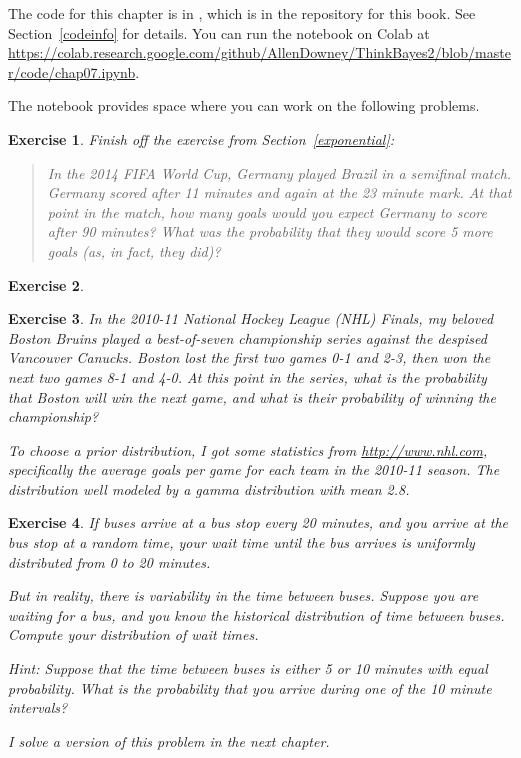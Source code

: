 \documentclass[12pt]{book}
\theoremstyle{exercise}
\newtheorem{exercise}{Exercise}[chapter]
\begin{document}
The code for this chapter is in , which is in the repository for this book.  See Section~\ref{codeinfo} for details.
You can run the notebook on Colab at \url{https://colab.research.google.com/github/AllenDowney/ThinkBayes2/blob/master/code/chap07.ipynb}.

The notebook provides space where you can work on the following problems.


\begin{exercise}
Finish off the exercise from Section~\ref{exponential}:

\begin{quote}
In the 2014 FIFA World Cup, Germany played Brazil in a semifinal match. Germany scored after 11 minutes and again at the 23 minute mark. 
At that point in the match, how many goals would you expect Germany to score after 90 minutes? 
What was the probability that they would score 5 more goals (as, in fact, they did)?
\end{quote}

\end{exercise}

\begin{exercise}
\end{exercise}



\begin{exercise}
In the 2010-11 National Hockey League (NHL) Finals, my beloved Boston
Bruins played a best-of-seven championship series against the despised
Vancouver Canucks.  Boston lost the first two games 0-1 and 2-3, then
won the next two games 8-1 and 4-0.  At this point in the series, what
is the probability that Boston will win the next game, and what is
their probability of winning the championship?

To choose a prior distribution, I got some statistics from
\url{http://www.nhl.com}, specifically the average goals per game
for each team in the 2010-11 season.  The distribution well modeled by a gamma distribution with mean 2.8.
\end{exercise}





\begin{exercise}

If buses arrive at a bus stop every 20 minutes, and you
arrive at the bus stop at a random time, your wait time until
the bus arrives is uniformly distributed from 0 to 20 minutes.

But in reality, there is variability in the time between
buses.  Suppose you are waiting for a bus, and you know the historical
distribution of time between buses.  Compute your distribution
of wait times.

Hint: Suppose that the time between buses is either
5 or 10 minutes with equal probability.  What is the probability
that you arrive during one of the 10 minute intervals?

I solve a version of this problem in the next chapter.

\end{exercise}
\end{document}
